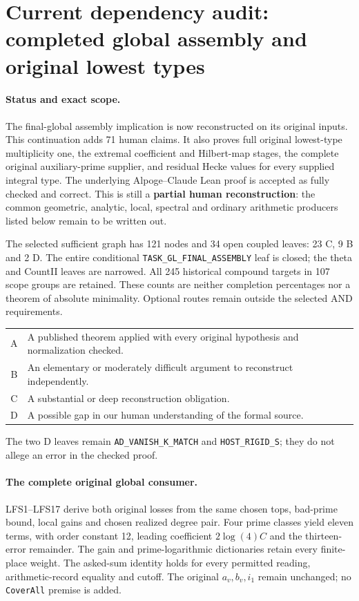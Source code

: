 \section{Current dependency audit: completed global assembly and original lowest types}
\label{sec:dependency-audit-v35}

\paragraph{Status and exact scope.}
The final-global assembly implication is now reconstructed on its original
inputs. This continuation adds 71 human claims. It also proves
full original lowest-type multiplicity one, the extremal coefficient and
Hilbert-map stages, the complete original auxiliary-prime supplier, and
residual Hecke values for every supplied integral type.
The underlying Alpoge--Claude Lean proof is accepted as fully checked
and correct. This is still a \textbf{partial human reconstruction}:
the common geometric, analytic, local, spectral and ordinary arithmetic
producers listed below remain to be written out.

The selected sufficient graph has 121 nodes and
34 open coupled leaves: 23 C,
9 B and 2 D.
The entire conditional \texttt{TASK\_GL\_FINAL\_ASSEMBLY} leaf is
closed; the theta and CountII leaves are narrowed. All 245 historical
compound targets in 107 scope groups are retained. These counts are
neither completion percentages nor a theorem of absolute minimality.
Optional routes remain outside the selected AND requirements.

\begin{center}\small
\begin{tabular}{cp{}}
A & A published theorem applied with every original hypothesis and normalization checked.\\
B & An elementary or moderately difficult argument to reconstruct independently.\\
C & A substantial or deep reconstruction obligation.\\
D & A possible gap in our human understanding of the formal source.\\
\end{tabular}
\end{center}
The two D leaves remain \texttt{AD\_VANISH\_K\_MATCH} and
\texttt{HOST\_RIGID\_S}; they do not allege an error in the checked proof.

\paragraph{The complete original global consumer.}
LFS1--LFS17 derive both original losses from the same chosen tops,
bad-prime bound, local gains and chosen realized degree pair.
Four prime classes yield eleven terms, with order constant 12,
leading coefficient $2\log(4)C$ and the thirteen-error remainder.
The gain and prime-logarithmic dictionaries retain every finite-place
weight. The asked-sum identity holds for every permitted reading,
arithmetic-record equality and cutoff. The original $a_v,b_v,i_1$
remain unchanged; no \texttt{CoverAll} premise is added.

